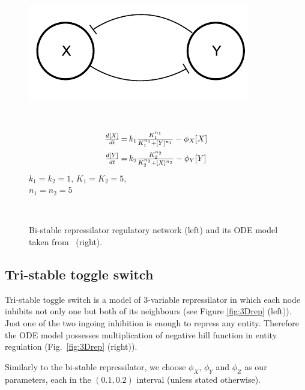 \begin{figure}
	\centering
	\begin{center}
		\vspace*{-6mm}
		\hspace*{-1cm}  
		\parbox{4cm}{\includegraphics[scale=.6]{2Drep.pdf}}~
		\parbox{6cm}{
			$$\begin{array}{c@{$\,=\,$}l}
			\frac{d[X]}{dt} & k_1 \frac{K_{1}^{n_1}}{K_{1}^{n_1}+[Y]^{n_1}} - \phi_{X}[X]\\[3mm]
			\frac{d[Y]}{dt} & k_2 \frac{K_{2}^{n_2}}{K_{2}^{n_2}+[X]^{n_2}} - \phi_{Y}[Y]
			\end{array}$$
			\center
			$k_1=k_2=1$, $K_{1}=K_{2}=5$, \\
			$n_1=n_2=5$
		}~~
		\vspace*{-5mm}
	\end{center}
	\caption{Bi-stable repressilator regulatory network (left) and its ODE model taken from~\cite{brim2015high} (right).}
	\vspace*{-0.5em}
	\label{fig:2Drep}
\end{figure}

\subsection{Tri-stable toggle switch}

Tri-stable toggle switch is a model of 3-variable repressilator in which each node inhibits not only one but both of its neighbours (see Figure \ref{fig:3Drep} (left)). Just one of the two ingoing inhibition is enough to repress any entity. Therefore the ODE model possesses multiplication of negative hill function in entity regulation (Fig.~\ref{fig:3Drep} (right)).

Similarly to the bi-stable repressilator, we choose $\phi_X$, $\phi_Y$ and $\phi_Z$ as our parameters, each in the $(0.1, 0.2)$ interval (unless stated otherwise). 

